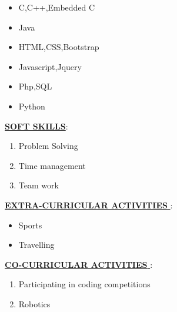 \documentclass[a4paper,12pt]{article}
\begin{document}
\begin{flushleft}
\begin{itemize}
 \item{C,C++,Embedded C}
 \item{Java}
 \item{HTML,CSS,Bootstrap}
 \item{Javascript,Jquery}
 \item{Php,SQL}
 \item{Python}
\end{itemize}
\underline{\textbf{SOFT SKILLS}}:\\[0.5cm]
\begin{enumerate}
 \item{Problem Solving}
 \item{Time management}
 \item{Team work}
\end{enumerate}
\underline{\textbf{EXTRA-CURRICULAR ACTIVITIES }}:\\[0.5cm]
\begin{itemize}
 \item{Sports}
 \item{Travelling}
\end{itemize}
\underline{\textbf{CO-CURRICULAR ACTIVITIES }}:\\[0.5cm]
\begin{enumerate}
 \item{Participating in coding competitions}
 \item{Robotics}
\end{enumerate}
 \end{flushleft}
\end{document}
